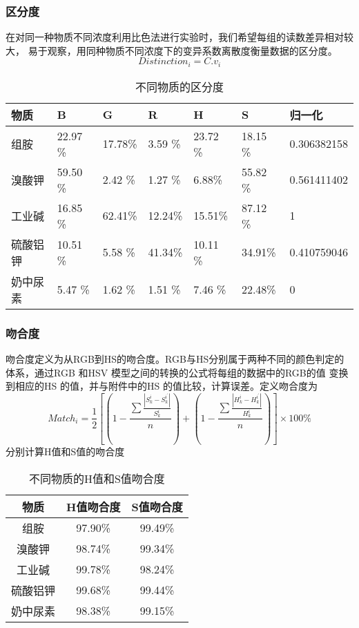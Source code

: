     \subsubsection{区分度}
    在对同一种物质不同浓度利用比色法进行实验时，我们希望每组的读数差异相对较大，
    易于观察，用同种物质不同浓度下的变异系数离散度衡量数据的区分度。
    $$Distinction_i={C.v}_i$$

    \begin{table}[H]
    \centering
    \caption{不同物质的区分度}
    \label{不同物质区分度}
    \begin{tabular}{@{}lllllll@{}}
    \toprule
    物质   & B     & G     & R     & H     & S     & 归一化         \\ \midrule
    组胺   & 22.97 \%& 17.78\% & 3.59 \% & 23.72 \%& 18.15 \%& 0.306382158 \\
    溴酸钾  & 59.50 \%& 2.42 \% & 1.27 \% & 6.88\%  & 55.82 \%& 0.561411402 \\
    工业碱  & 16.85 \%& 62.41\% & 12.24\% & 15.51\% & 87.12 \%& 1           \\
    硫酸铝钾 & 10.51 \%& 5.58 \% & 41.34\% & 10.11 \%& 34.91\% & 0.410759046 \\
    奶中尿素 & 5.47  \%& 1.62 \% & 1.51 \% & 7.46 \% & 22.48\% & 0           \\ \bottomrule
    \end{tabular}
    \end{table}
    
    
    \subsubsection{吻合度}
    吻合度定义为从RGB到HS的吻合度。RGB与HS分别属于两种不同的颜色判定的体系，通过RGB 和HSV 模型之间的转换的公式将每组的数据中的RGB的值
    变换到相应的HS 的值，并与附件中的HS 的值比较，计算误差。定义吻合度为
    $$Match_i=\frac{1}{2}[(1-\frac{\sum\frac{|S^{i}_{k}-S^{i^{'}}_k|}{S^{i}_{k}}}{n})
    +(1-\frac{\sum\frac{|H^{i}_{k}-H^{i^{'}}_k|}{H^{i}_{k}}}{n})]\times 100\%$$
    分别计算H值和S值的吻合度
    \begin{table}[H]
      \centering
      \caption{不同物质的H值和S值吻合度}
      \label{吻合度表}
      \begin{tabular}{@{}ccc@{}}
      \toprule
      物质 & H值吻合度  & S值吻合度   \\ \midrule
      组胺 & 97.90\% & 99.49\% \\
      溴酸钾 & 98.74\% & 99.34\% \\
      工业碱 & 99.78\% & 98.24\% \\
      硫酸铝钾 & 99.68\% & 99.44\% \\
      奶中尿素 & 98.38\% & 99.15\% \\ \bottomrule
      \end{tabular}
    \end{table}
    

